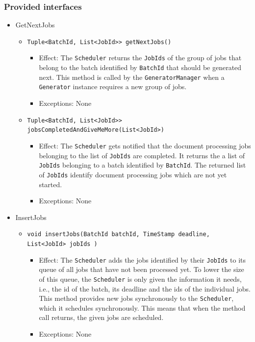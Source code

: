 \documentclass[a4paper,10pt]{article}
\begin{document}
\subsubsection*{Provided interfaces}
\begin{itemize}
    \item GetNextJobs
    \begin{itemize}
        \item \texttt{Tuple<BatchId, List<JobId>> getNextJobs()}
        \begin{itemize}
            \item Effect: The \texttt{Scheduler} returns the \texttt{JobIds} of the group of jobs that belong to the batch identified by \texttt{BatchId} that should be generated next. This method is called by the \texttt{GeneratorManager} when a \texttt{Generator} instance requires a new group of jobs.
            \item Exceptions: None
		\end{itemize}

        \item \texttt{Tuple<BatchId, List<JobId>>  jobsCompletedAndGiveMeMore(List<JobId>)}
        \begin{itemize}
            \item Effect: The \texttt{Scheduler} gets notified that the document processing jobs belonging to the list of \texttt{JobIds} are completed. It returns the a list of \texttt{JobIds} belonging to a batch identified by \texttt{BatchId}. The returned list of \texttt{JobIds} identify document processing jobs which are not yet started.
            \item Exceptions: None
        \end{itemize}
    \end{itemize}
    

    \item InsertJobs
    \begin{itemize}
        \item \texttt{void insertJobs(BatchId batchId, TimeStamp deadline, List<JobId> jobIds )}
        \begin{itemize}
            \item Effect: The \texttt{Scheduler} adds the jobs identified by their \texttt{JobIds} to its queue of all jobs that have not been processed yet. To lower the size of this queue, the \texttt{Scheduler} is only given the information it needs, i.e., the id of the batch, its deadline and the ids of the individual jobs. This method provides new jobs synchronously to the \texttt{Scheduler}, which it schedules synchronously. This means that when the method call returns, the given jobs are scheduled.
            \item Exceptions: None
        \end{itemize}
    \end{itemize}
    

\end{itemize}
\end{document}
